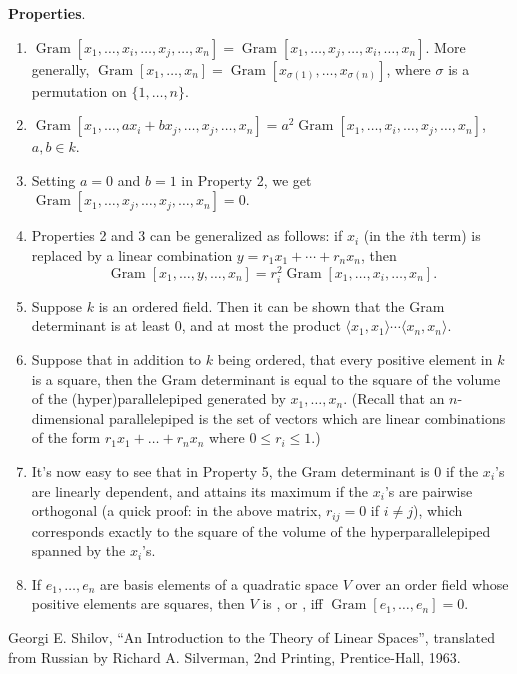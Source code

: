 \documentclass[12pt]{article}
\begin{document}
\textbf{Properties}.
\begin{enumerate}
\item $\operatorname{Gram}[x_1,\ldots,x_i,\ldots,x_j,\ldots,x_n]=
\operatorname{Gram}[x_1,\ldots,x_j,\ldots,x_i,\ldots,x_n]$.  More generally, $\operatorname{Gram}[x_1,\ldots,x_n]=
\operatorname{Gram}[x_{\sigma(1)},\ldots,x_{\sigma(n)}]$, where $\sigma$ is a permutation on $\lbrace 1,\ldots,n\rbrace$.
\item $\operatorname{Gram}[x_1,\ldots,ax_i+bx_j,\ldots,x_j,\ldots,x_n]=
a^2\operatorname{Gram}[x_1,\ldots,x_i,\ldots,x_j,\ldots,x_n]$, $a,b\in k$.
\item Setting $a=0$ and $b=1$ in Property 2, we get  $\operatorname{Gram}[x_1,\ldots,x_j,\ldots,x_j,\ldots,x_n]=0$.
\item Properties 2 and 3 can be generalized as follows: if $x_i$ (in the $i$th term) is replaced by a linear combination $y=r_1x_1+\cdots+r_nx_n$, then $$\operatorname{Gram}[x_1,\ldots,y,\ldots,x_n]=
r_i^2\operatorname{Gram}[x_1,\ldots,x_i,\ldots,x_n].$$
\item Suppose $k$ is an ordered field.  Then it can be shown that the Gram determinant is at least 0, and at most the product $\langle x_1,x_1\rangle \cdots \langle x_n,x_n\rangle$.
\item Suppose that in addition to $k$ being ordered, that every positive element in $k$ is a square, then the Gram determinant is equal to the square of the volume of the (hyper)parallelepiped generated by $x_1,\ldots,x_n$.  (Recall that an $n$-dimensional parallelepiped is the set of vectors which are linear combinations of the form $r_1x_1+\ldots+r_nx_n$ where $0\le r_i\le 1$.)
\item It's now easy to see that in Property 5, the Gram determinant is 0 if the $x_i$'s are linearly dependent, and attains its maximum if the $x_i$'s are pairwise orthogonal (a quick proof: in the above matrix, $r_{ij}=0$ if $i\neq j$), which corresponds exactly to the square of the volume of the hyperparallelepiped spanned by the $x_i$'s.
\item If $e_1,\ldots,e_n$ are basis elements of a quadratic space $V$ over an order field whose positive elements are squares, then $V$ is , or , iff $\operatorname{Gram}[e_1,\ldots,e_n]=0$.
\end{enumerate}


\begin{thebibliography}{99}
 Georgi E. Shilov, ``An Introduction to the Theory of Linear Spaces'', translated from Russian by Richard A. Silverman, 2nd Printing, Prentice-Hall, 1963.
\end{thebibliography}
\end{document}
